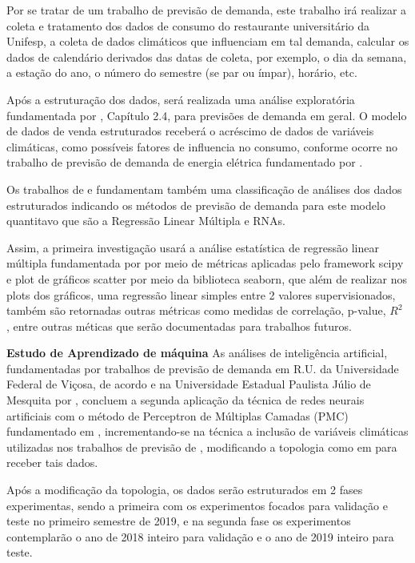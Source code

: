 \documentclass[	12pt, Times, openright, twoside, a4paper, english, brazil]{abntex2}
\begin{document}
          Por se tratar de um trabalho de previsão de demanda,  este trabalho irá realizar a coleta e tratamento dos dados de consumo do restaurante universitário da Unifesp, a coleta de dados climáticos que influenciam em tal demanda, calcular os dados de calendário derivados das datas de coleta, por exemplo, o dia da semana, a estação do ano, o número do semestre (se par ou ímpar), horário, etc.

          Após a estruturação dos dados, será realizada uma análise exploratória fundamentada por \cite{Junior2007}, Capítulo 2.4, para previsões de demanda em geral.
          O modelo de dados de venda estruturados receberá o acréscimo de dados de variáveis climáticas, como possíveis fatores de influencia no consumo, conforme ocorre no trabalho de previsão de demanda de energia elétrica fundamentado por \cite{Almeida2013,RUAS2012,Silva2010}.

          Os trabalhos de \cite{Junior2007} e \cite{Silva2010} fundamentam também uma classificação de análises dos dados estruturados indicando os métodos de previsão de demanda para este modelo quantitavo que são a Regressão Linear Múltipla e RNAs.

          Assim, a primeira investigação usará a análise estatística de regressão linear múltipla fundamentada por \cite{Clarice2011} por meio de métricas aplicadas pelo framework scipy e plot de gráficos scatter por meio da biblioteca seaborn, que além de realizar nos plots dos gráficos, uma regressão linear simples entre 2 valores supervisionados, também são retornadas outras métricas como medidas de correlação, p-value, $R^2$ , entre outras méticas que serão documentadas para trabalhos futuros.

        \textbf{Estudo de Aprendizado de máquina}
          As análises de inteligência artificial, fundamentadas por trabalhos de previsão de demanda em R.U. da Universidade Federal de Viçosa, de acordo \cite{Lopes2008} e na Universidade Estadual Paulista Júlio de Mesquita por \cite{Rocha2011}, concluem a segunda aplicação da técnica de redes neurais artificiais com o método de Perceptron de Múltiplas Camadas (PMC) fundamentado em \cite{Haykin1994}, incrementando-se na técnica a inclusão de variáveis climáticas utilizadas nos trabalhos de previsão de  \cite{Almeida2013, RUAS2012, Silva2010}, modificando a topologia como em \cite{Lopes2008} para receber tais dados. 

          Após a modificação da topologia, os dados serão estruturados em 2 fases experimentas, sendo a primeira com os experimentos focados para validação e teste no primeiro semestre de 2019, e na segunda fase os experimentos contemplarão o ano de 2018 inteiro para validação e o ano de 2019 inteiro para teste.
\end{document}
